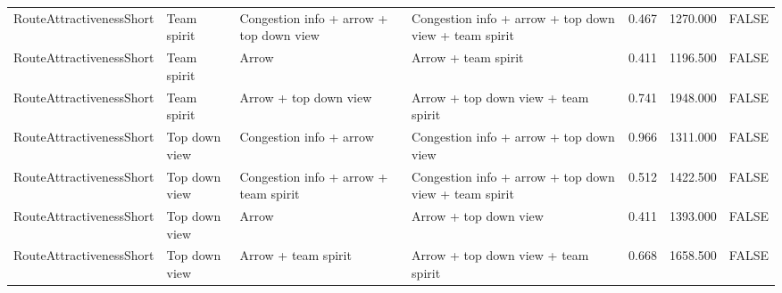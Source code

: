 \begin{tabular}{llllrrl}
  RouteAttractivenessShort & Team spirit & Congestion info + arrow + top down view & Congestion info + arrow + top down view + team spirit & 0.467 & 1270.000 & FALSE \\ 
  RouteAttractivenessShort & Team spirit & Arrow & Arrow + team spirit & 0.411 & 1196.500 & FALSE \\ 
  RouteAttractivenessShort & Team spirit & Arrow + top down view & Arrow + top down view + team spirit & 0.741 & 1948.000 & FALSE \\ 
  RouteAttractivenessShort & Top down view & Congestion info + arrow & Congestion info + arrow + top down view & 0.966 & 1311.000 & FALSE \\ 
  RouteAttractivenessShort & Top down view & Congestion info + arrow + team spirit & Congestion info + arrow + top down view + team spirit & 0.512 & 1422.500 & FALSE \\ 
  RouteAttractivenessShort & Top down view & Arrow & Arrow + top down view & 0.411 & 1393.000 & FALSE \\ 
  RouteAttractivenessShort & Top down view & Arrow + team spirit & Arrow + top down view + team spirit & 0.668 & 1658.500 & FALSE \\ 
   \hline
\end{tabular}
